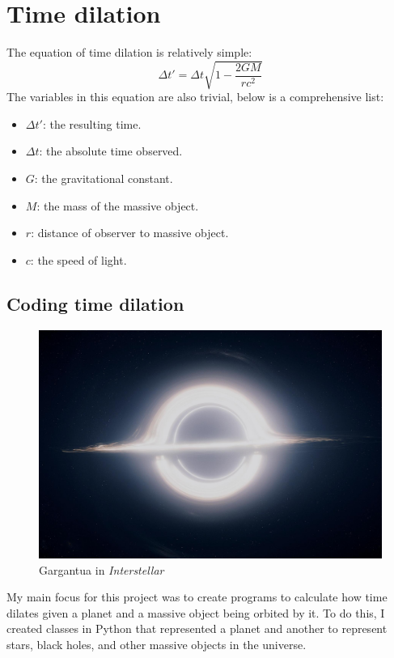 \documentclass{article}
\begin{document}
\section{Time dilation}

The equation of time dilation is relatively simple:
\begin{equation}
    \Delta t' = \Delta t \sqrt{1 - \frac{2GM}{rc^2}}
\end{equation}
The variables in this equation are also trivial, below is a comprehensive list:
\begin{itemize}
    \item $\Delta t'$: the resulting time.
    \item $\Delta t$: the absolute time observed.
    \item $G$: the gravitational constant.
    \item $M$: the mass of the massive object.
    \item $r$: distance of observer to massive object.
    \item $c$: the speed of light.
\end{itemize}

\subsection{Coding time dilation}

\begin{figure}
    \centering
    \includegraphics[scale=0.15]{images/gargantua.jpeg}
    \caption{Gargantua in \textit{Interstellar}}
    \label{fig:gargantua}
\end{figure}

My main focus for this project was to create programs to calculate how time dilates given a planet and a massive object
being orbited by it. To do this, I created classes in Python that represented a planet and another to represent stars, black
holes, and other massive objects in the universe.
\end{document}
